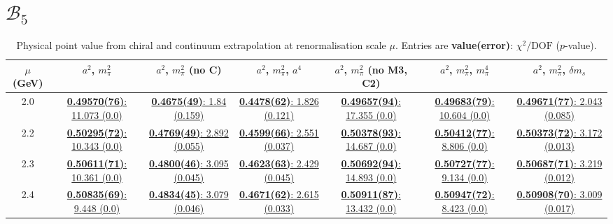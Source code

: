 \documentclass[12pt]{extarticle}
\begin{document}
\section{$\mathcal{B}_5$}
\begin{table}[h!]
\begin{center}
\begin{tabular}{|c|c|c|c|c|c|c|}
\hline
$\mu$ (GeV) & $a^2$, $m_\pi^2$& $a^2$, $m_\pi^2$ (no C)& $a^2$, $m_\pi^2$, $a^4$& $a^2$, $m_\pi^2$ (no M3, C2)& $a^2$, $m_\pi^2$, $m_\pi^4$& $a^2$, $m_\pi^2$, $\delta m_s$\\
\hline
2.0& \hyperlink{TT/SUSY/a2m2_20.pdf.1}{\textbf{0.49570(76)}: 11.073 (0.0)} & \hyperlink{TT/SUSY/a2m2noC_20.pdf.1}{\textbf{0.4675(49)}: 1.84 (0.159)} & \hyperlink{TT/SUSY/a2a4m2_20.pdf.1}{\textbf{0.4478(62)}: 1.826 (0.121)} & \hyperlink{TT/SUSY/a2m2mcut_20.pdf.1}{\textbf{0.49657(94)}: 17.355 (0.0)} & \hyperlink{TT/SUSY/a2m2m4_20.pdf.1}{\textbf{0.49683(79)}: 10.604 (0.0)} & \hyperlink{TT/SUSY/a2m2delm_20.pdf.1}{\textbf{0.49671(77)}: 2.043 (0.085)}\\
2.2& \hyperlink{TT/SUSY/a2m2_22.pdf.1}{\textbf{0.50295(72)}: 10.343 (0.0)} & \hyperlink{TT/SUSY/a2m2noC_22.pdf.1}{\textbf{0.4769(49)}: 2.892 (0.055)} & \hyperlink{TT/SUSY/a2a4m2_22.pdf.1}{\textbf{0.4599(66)}: 2.551 (0.037)} & \hyperlink{TT/SUSY/a2m2mcut_22.pdf.1}{\textbf{0.50378(93)}: 14.687 (0.0)} & \hyperlink{TT/SUSY/a2m2m4_22.pdf.1}{\textbf{0.50412(77)}: 8.806 (0.0)} & \hyperlink{TT/SUSY/a2m2delm_22.pdf.1}{\textbf{0.50373(72)}: 3.172 (0.013)}\\
2.3& \hyperlink{TT/SUSY/a2m2_23.pdf.1}{\textbf{0.50611(71)}: 10.361 (0.0)} & \hyperlink{TT/SUSY/a2m2noC_23.pdf.1}{\textbf{0.4800(46)}: 3.095 (0.045)} & \hyperlink{TT/SUSY/a2a4m2_23.pdf.1}{\textbf{0.4623(63)}: 2.429 (0.045)} & \hyperlink{TT/SUSY/a2m2mcut_23.pdf.1}{\textbf{0.50692(94)}: 14.893 (0.0)} & \hyperlink{TT/SUSY/a2m2m4_23.pdf.1}{\textbf{0.50727(77)}: 9.134 (0.0)} & \hyperlink{TT/SUSY/a2m2delm_23.pdf.1}{\textbf{0.50687(71)}: 3.219 (0.012)}\\
2.4& \hyperlink{TT/SUSY/a2m2_24.pdf.1}{\textbf{0.50835(69)}: 9.448 (0.0)} & \hyperlink{TT/SUSY/a2m2noC_24.pdf.1}{\textbf{0.4834(45)}: 3.079 (0.046)} & \hyperlink{TT/SUSY/a2a4m2_24.pdf.1}{\textbf{0.4671(62)}: 2.615 (0.033)} & \hyperlink{TT/SUSY/a2m2mcut_24.pdf.1}{\textbf{0.50911(87)}: 13.432 (0.0)} & \hyperlink{TT/SUSY/a2m2m4_24.pdf.1}{\textbf{0.50947(72)}: 8.423 (0.0)} & \hyperlink{TT/SUSY/a2m2delm_24.pdf.1}{\textbf{0.50908(70)}: 3.009 (0.017)}\\
\hline
\end{tabular}
\caption{Physical point value from chiral and continuum extrapolation at renormalisation scale $\mu$. Entries are \textbf{value(error)}: $\chi^2/\text{DOF}$ ($p$-value).}
\end{center}
\end{table}
\end{document}
